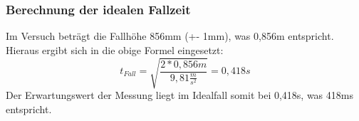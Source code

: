 \subsubsection{Berechnung der idealen Fallzeit}
Im Versuch beträgt die Fallhöhe 856mm (+- 1mm), was 0,856m entspricht. Hieraus ergibt sich in die obige Formel eingesetzt:
\begin{equation}
    t_{Fall}=\sqrt{\frac{2*0,856m}{9,81\frac{m}{s^{2}}}}=0,418s
\end{equation}
Der Erwartungswert der Messung liegt im Idealfall somit bei 0,418s, was 418ms entspricht.
\fi
